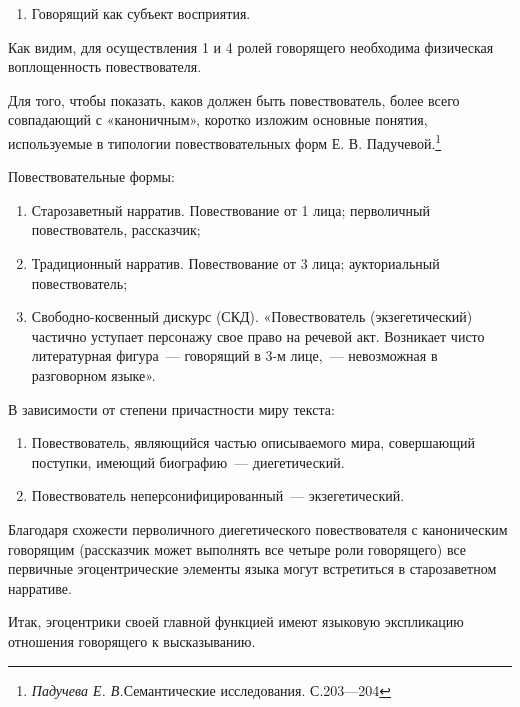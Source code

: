 \documentclass{kursa4}
\begin{document}
{\begin{enumerate}
        \item Говорящий как субъект восприятия.
       
      \end{enumerate}

      \bigskip

      Как видим, для осуществления 1 и 4 ролей говорящего необходима
      физическая воплощенность повествователя. 

      Для того, чтобы показать, каков должен быть повествователь, более
      всего совпадающий с «каноничным», коротко изложим основные понятия,
      используемые в типологии повествовательных форм Е. В.
      Падучевой.\footnote{\textit{Падучева Е. В.}Семантические исследования. С.203—204} \newline

      Повествовательные формы:
      \begin{enumerate}
        \item Старозаветный нарратив. Повествование от 1 лица; перволичный
        повествователь, рассказчик; 
        \item Традиционный нарратив. Повествование от 3 лица; аукториальный
        повествователь;
        \item Свободно-косвенный дискурс (СКД). «Повествователь (экзегетический)
        частично уступает персонажу свое право на речевой акт. Возникает чисто
        литературная фигура~--- говорящий в 3-м лице,~--- невозможная в разговорном
        языке».
      \end{enumerate}

      В зависимости от степени причастности миру текста:
      \begin{enumerate}
        \item Повествователь, являющийся частью описываемого мира,
        совершающий поступки, имеющий биографию~--- диегетический. 
        \item Повествователь неперсонифицированный~--- экзегетический. 
       \end{enumerate} 

      Благодаря схожести перволичного диегетического повествователя с
      каноническим говорящим (рассказчик может выполнять все четыре роли
      говорящего) все первичные эгоцентрические элементы языка могут
      встретиться в старозаветном нарративе. 

      Итак, эгоцентрики своей главной функцией имеют языковую экспликацию
      отношения говорящего к высказыванию. 

}
\end{document}

